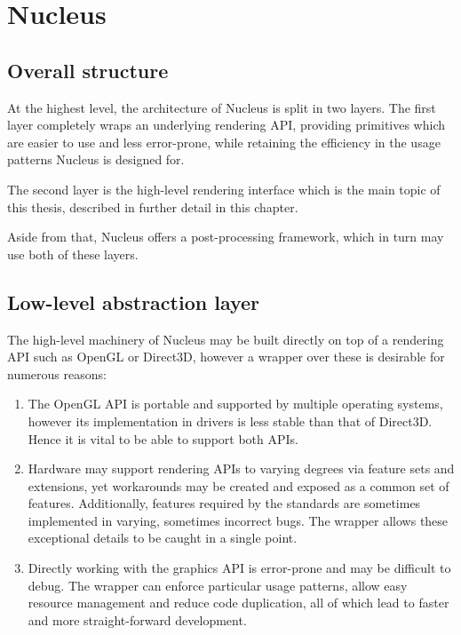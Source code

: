 
\chapter{ Nucleus }
\label{Chapter4}

\section{Overall structure}

At the highest level, the architecture of Nucleus is split in two layers. The first layer completely wraps an underlying rendering API, providing primitives which are easier to use and less error-prone, while retaining the efficiency in the usage patterns Nucleus is designed for.

The second layer is the high-level rendering interface which is the main topic of this thesis, described in further detail in this chapter.

Aside from that, Nucleus offers a post-processing framework, which in turn may use both of these layers.

\section{Low-level abstraction layer}
\label{sec:lowLevelInfo}

The high-level machinery of Nucleus may be built directly on top of a rendering API such as OpenGL or Direct3D, however a wrapper over these is desirable for numerous reasons:

\begin{enumerate}
\item The OpenGL API is portable and supported by multiple operating systems, however its implementation in drivers is less stable than that of Direct3D. Hence  it is vital to be able to support both APIs.
\item Hardware may support rendering APIs to varying degrees via feature sets and extensions, yet workarounds may be created and exposed as a common set of features. Additionally, features required by the standards are sometimes implemented in varying, sometimes incorrect bugs. The wrapper allows these exceptional details to be caught in a single point.
\item Directly working with the graphics API is error-prone and may be difficult to debug. The wrapper can enforce particular usage patterns, allow easy resource management and reduce code duplication, all of which lead to faster and more straight-forward development.
\end{enumerate}

